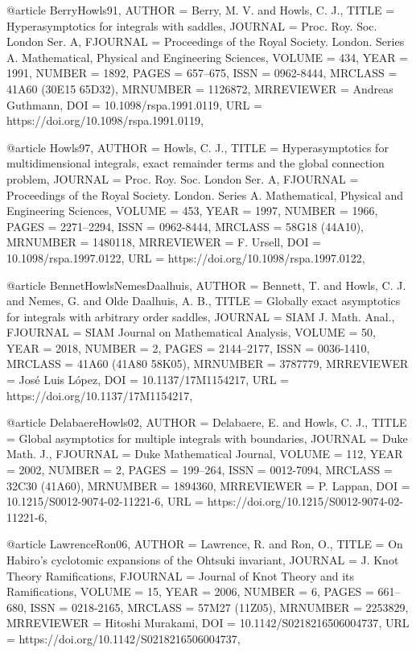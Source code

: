 @article {BerryHowls91,
    AUTHOR = {Berry, M. V. and Howls, C. J.},
     TITLE = {Hyperasymptotics for integrals with saddles},
   JOURNAL = {Proc. Roy. Soc. London Ser. A},
  FJOURNAL = {Proceedings of the Royal Society. London. Series A.
              Mathematical, Physical and Engineering Sciences},
    VOLUME = {434},
      YEAR = {1991},
    NUMBER = {1892},
     PAGES = {657--675},
      ISSN = {0962-8444},
   MRCLASS = {41A60 (30E15 65D32)},
  MRNUMBER = {1126872},
MRREVIEWER = {Andreas Guthmann},
       DOI = {10.1098/rspa.1991.0119},
       URL = {https://doi.org/10.1098/rspa.1991.0119},
}

@article {Howls97,
    AUTHOR = {Howls, C. J.},
     TITLE = {Hyperasymptotics for multidimensional integrals, exact
              remainder terms and the global connection problem},
   JOURNAL = {Proc. Roy. Soc. London Ser. A},
  FJOURNAL = {Proceedings of the Royal Society. London. Series A.
              Mathematical, Physical and Engineering Sciences},
    VOLUME = {453},
      YEAR = {1997},
    NUMBER = {1966},
     PAGES = {2271--2294},
      ISSN = {0962-8444},
   MRCLASS = {58G18 (44A10)},
  MRNUMBER = {1480118},
MRREVIEWER = {F. Ursell},
       DOI = {10.1098/rspa.1997.0122},
       URL = {https://doi.org/10.1098/rspa.1997.0122},
}

@article {BennetHowlsNemesDaalhuis,
    AUTHOR = {Bennett, T. and Howls, C. J. and Nemes, G. and Olde Daalhuis,
              A. B.},
     TITLE = {Globally exact asymptotics for integrals with arbitrary order
              saddles},
   JOURNAL = {SIAM J. Math. Anal.},
  FJOURNAL = {SIAM Journal on Mathematical Analysis},
    VOLUME = {50},
      YEAR = {2018},
    NUMBER = {2},
     PAGES = {2144--2177},
      ISSN = {0036-1410},
   MRCLASS = {41A60 (41A80 58K05)},
  MRNUMBER = {3787779},
MRREVIEWER = {Jos\'e Luis L\'opez},
       DOI = {10.1137/17M1154217},
       URL = {https://doi.org/10.1137/17M1154217},
}

@article {DelabaereHowls02,
    AUTHOR = {Delabaere, E. and Howls, C. J.},
     TITLE = {Global asymptotics for multiple integrals with boundaries},
   JOURNAL = {Duke Math. J.},
  FJOURNAL = {Duke Mathematical Journal},
    VOLUME = {112},
      YEAR = {2002},
    NUMBER = {2},
     PAGES = {199--264},
      ISSN = {0012-7094},
   MRCLASS = {32C30 (41A60)},
  MRNUMBER = {1894360},
MRREVIEWER = {P. Lappan},
       DOI = {10.1215/S0012-9074-02-11221-6},
       URL = {https://doi.org/10.1215/S0012-9074-02-11221-6},
}

@article {LawrenceRon06,
    AUTHOR = {Lawrence, R. and Ron, O.},
     TITLE = {On {H}abiro's cyclotomic expansions of the {O}htsuki
              invariant},
   JOURNAL = {J. Knot Theory Ramifications},
  FJOURNAL = {Journal of Knot Theory and its Ramifications},
    VOLUME = {15},
      YEAR = {2006},
    NUMBER = {6},
     PAGES = {661--680},
      ISSN = {0218-2165},
   MRCLASS = {57M27 (11Z05)},
  MRNUMBER = {2253829},
MRREVIEWER = {Hitoshi Murakami},
       DOI = {10.1142/S0218216506004737},
       URL = {https://doi.org/10.1142/S0218216506004737},
}

